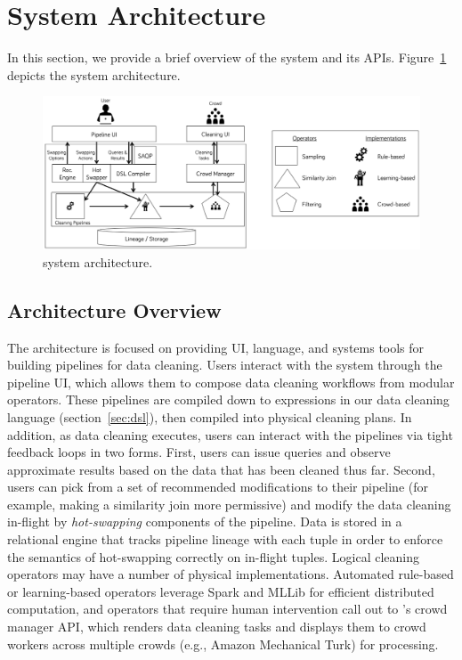 \section{System Architecture}

In this section, we provide a brief overview of the \sys system and its APIs.
Figure~\ref{fig:arch} depicts the system architecture.

\begin{figure}[ht]
\centering
\includegraphics[width = \textwidth]{figs/architecture.png}
\caption{\sys system architecture.}
\label{fig:arch}
\end{figure}

\subsection{Architecture Overview}
The \sys architecture is focused on providing UI, language, and systems tools for building pipelines for data cleaning. 
Users interact with the system through the pipeline UI, which allows them to compose data cleaning workflows from modular operators.
These pipelines are compiled down to expressions in our data cleaning language (section~\ref{sec:dsl}), then compiled into physical cleaning plans.
In addition, as data cleaning executes, users can interact with the pipelines via tight feedback loops in two forms.
First, users can issue queries and observe approximate results based on the data that has been cleaned thus far.
Second, users can pick from a set of recommended modifications to their pipeline (for example, making a similarity join more permissive) and modify the data cleaning in-flight by \textit{hot-swapping} components of the pipeline.
Data is stored in a relational engine that tracks pipeline lineage with each tuple in order to enforce the semantics of hot-swapping correctly on in-flight tuples.
Logical cleaning operators may have a number of physical implementations.
Automated rule-based or learning-based operators leverage Spark and MLLib for efficient distributed computation, and operators that require human intervention call out to \sys's crowd manager API, which renders data cleaning tasks and displays them to crowd workers across multiple crowds (e.g., Amazon Mechanical Turk) for processing.

